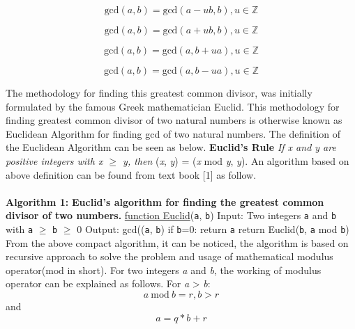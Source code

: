 \documentclass[conference]{IEEEtran}
\newcommand{\Z}{{\mathbb Z}}
\newcommand{\var}[1]{\textit{#1}}
\newcommand{\progvar}[1]{\texttt{#1}}
\renewcommand{\mod}{\text{mod}}
\renewcommand{\gcd}{\text{gcd}}
\begin{document}
\begin{equation} \label{eq:gcd_mul_difference} 
\gcd(a,b) = \gcd(a-ub,b), u\in\Z
\end{equation}

\begin{equation} \label{eq:gcd_mul_difference}  
\gcd(a,b) = \gcd(a+ub,b), u\in\Z
\end{equation}

\begin{equation} \label{eq:gcd_mul_difference} 
\gcd(a,b) = \gcd(a, b+ua), u\in\Z
\end{equation}

\begin{equation} \label{eq:gcd_mul_difference} 
\gcd(a,b) = \gcd(a, b-ua), u\in\Z
\end{equation}

The methodology for finding this greatest common divisor, was initially formulated by the famous Greek mathematician Euclid. This methodology for finding greatest common divisor of two natural numbers is otherwise known as Euclidean Algorithm for finding gcd of two natural numbers. The definition of the Euclidean Algorithm can be seen as below.
\newline \newline \textbf {Euclid's Rule} \textit {If x and y are positive integers with x $\geq$ y, then} \newline 
\gcd(\var{x}, \var{y}) = \gcd(\var{x} $\mod $ \var{y}, \var{y}).
\newline 
\newline An algorithm based on above definition can be found from text book [1] as follow.
\\~\\
\textbf{Algorithm 1:}
\newline
\textbf {Euclid's algorithm for finding the greatest common divisor of two numbers.}\newline
\underline {function Euclid}(\progvar{a}, \progvar{b})
\newline 
Input: Two integers \progvar{a} and \progvar{b} with \progvar{a} $\geq$ \progvar{b} $\geq$ 0 
\newline Output: gcd((\progvar{a}, \progvar{b})
\newline
\newline if \progvar{b}=0: return \progvar{a}
\newline return Euclid(\progvar{b}, \progvar{a} mod \progvar{b})
\newline 
\newline From the above compact algorithm, it can be noticed, the algorithm is based on recursive approach to solve the problem and usage of mathematical modulus operator($\mod $ in short).
For two integers \var{a} and \var{b}, the working of modulus operator can be explained as follows.
For \var{a} > \var{b}:
\begin{equation} \label{eq:gcd_modulus_1}
a \> \mod \> b = r,  b > r
\end{equation}
and
\begin{equation} \label{eq:gcd_modulus_2}
a = q * b + r
\end{equation}
\end{document}
